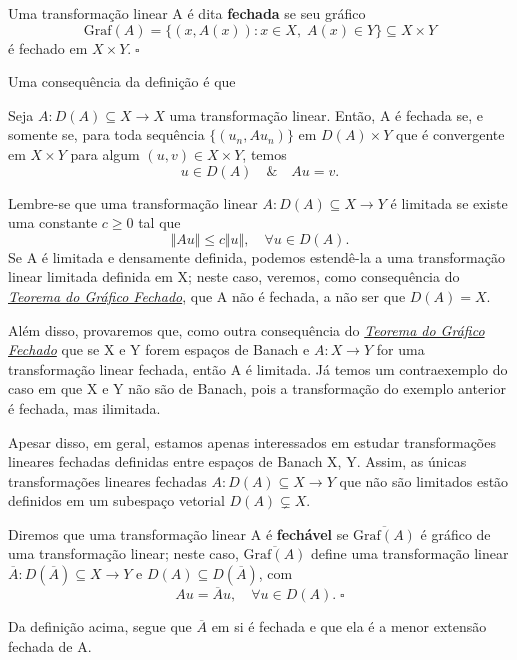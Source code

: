 \documentclass[../functional_analysis.tex]{subfiles}
\begin{document}
\begin{def*}
	Uma transformação linear A é dita \textbf{fechada} se seu gráfico
	\[
		\mathrm{Graf}(A) = \{(x, A(x)): x\in X,\; A(x)\in Y\} \subseteq X\times Y
	\]
	é fechado em \(X\times Y.\; \square\)
\end{def*}
Uma consequência da definição é que
\begin{prop*}
	Seja \(A:D(A)\subseteq X\rightarrow X\) uma transformação linear. Então, A é fechada se, e somente se, para toda sequência \(\{(u_{n}, Au_{n})\}\) em \(D(A)\times Y\) que é convergente em \(X\times Y\) para algum \((u, v)\in X\times Y\), temos
	\[
		u\in D(A) \quad\&\quad Au = v.
	\]
\end{prop*}


Lembre-se que uma transformação linear \(A:D(A)\subseteq X\rightarrow Y\) é limitada se existe uma constante \(c\geq 0\) tal que
\[
	\Vert Au \Vert\leq c\Vert u \Vert,\quad \forall u\in D(A).
\]
Se A é limitada e densamente definida, podemos estendê-la a uma transformação linear limitada definida em X; neste caso, veremos, como consequência do \hyperlink{closed_graphic}{\textit{Teorema do Gráfico Fechado}}, que A não é fechada, a não ser que \(D(A) = X.\)

Além disso, provaremos que, como outra consequência do \hyperlink{closed_graphic}{\textit{Teorema do Gráfico Fechado}} que se X e Y forem espaços de Banach e \(A:X\rightarrow Y\) for uma transformação linear fechada, então A é limitada. Já temos um contraexemplo do caso em que X e Y não são de Banach, pois a transformação do exemplo anterior é fechada, mas ilimitada.

Apesar disso, em geral, estamos apenas interessados em estudar transformações lineares fechadas definidas entre espaços de Banach X, Y. Assim, as únicas transformações lineares fechadas \(A:D(A)\subseteq X\rightarrow Y\) que não são limitados estão definidos em um subespaço vetorial \(D(A)\subsetneq X\).

\begin{def*}
	Diremos que uma transformação linear A é \textbf{fechável} se \(\overline{\mathrm{Graf}(A)}\) é gráfico de uma transformação linear; neste caso, \(\overline{\mathrm{Graf}(A)}\) define uma transformação linear \(\overline{A}: D(\overline{A})\subseteq X\rightarrow Y\) e \(D(A)\subseteq D(\overline{A})\), com
	\[
		Au = \overline{A}u,\quad \forall u\in D(A).\; \square
	\]
\end{def*}
Da definição acima, segue que \(\overline{A}\) em si é fechada e que ela é a menor extensão fechada de A.
\end{document}
